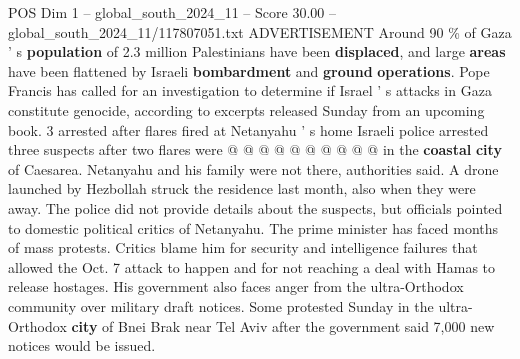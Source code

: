 \begin{textsample}{POS Dim 1 – global\_south\_2024\_11 – Score 30.00 – global\_south\_2024\_11/117807051.txt}
ADVERTISEMENT Around 90 \% of Gaza ' s \textbf{population} of 2.3 million Palestinians have been \textbf{displaced}, and large \textbf{areas} have been flattened by Israeli \textbf{bombardment} and \textbf{ground} \textbf{operations}.
Pope Francis has called for an investigation to determine if Israel ' s attacks in Gaza constitute genocide, according to excerpts released Sunday from an upcoming book. 3 arrested after flares fired at Netanyahu ' s home Israeli police arrested three suspects after two flares were @ @ @ @ @ @ @ @ @ @ in the \textbf{coastal} \textbf{city} of Caesarea.
Netanyahu and his family were not there, authorities said.
A drone launched by Hezbollah struck the residence last month, also when they were away.
The police did not provide details about the suspects, but officials pointed to domestic political critics of Netanyahu.
The prime minister has faced months of mass protests.
Critics blame him for security and intelligence failures that allowed the Oct. 7 attack to happen and for not reaching a deal with Hamas to release hostages.
His government also faces anger from the ultra-Orthodox community over military draft notices.
Some protested Sunday in the ultra-Orthodox \textbf{city} of Bnei Brak near Tel Aviv after the government said 7,000 new notices would be issued.

\end{textsample}
